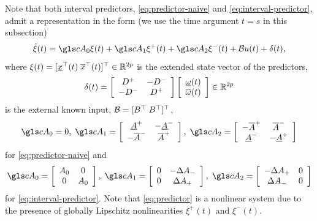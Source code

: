 Note that both interval predictors, \eqref{eq:predictor-naive} and
\eqref{eq:interval-predictor}, admit a representation in the form (we use the
time argument $t=s$ in this subsection)
\begin{equation}
\dot{\xi}(t)=\cA_{0}\xi(t)+\cA_{1}\xi^{+}(t)+\cA_{2}\xi^{-}(t)+\cB u(t)+\delta(t),\label{eq:predictor}
\end{equation}
where $\xi(t)=[\underline{x}^{\top}(t)\;\overline{x}^{\top}(t)]^{\top}\in\mathbb{R}^{2p}$
is the extended state vector of the predictors,
\[
\delta(t)=\left[\begin{array}{cc}
D^{+} & -D^{-}\\
-D^{-} & D^{+}
\end{array}\right]\left[\begin{array}{c}
\underline{\omega}(t)\\
\overline{\omega}(t)
\end{array}\right]\in\mathbb{R}^{2p}
\]
is the external known input, $\mathcal{B}=[B^{\top}\;B^{\top}]^{\top}$, 
\[
\cA_{0}=0,\;\cA_{1}=\left[\begin{array}{cc}
\underline{A}^{+} & -\underline{A}^{-}\\
-\overline{A}^{-} & \overline{A}^{+}
\end{array}\right],\;\cA_{2}=\left[\begin{array}{cc}
-\overline{A}^{+} & \overline{A}^{-}\\
\underline{A}^{-} & -\underline{A}^{+}
\end{array}\right]
\]
for \eqref{eq:predictor-naive} and
\[
\cA_{0}=\left[\begin{array}{cc}
A_{0} & 0\\
0 & A_{0}
\end{array}\right],\;\cA_{1}=\left[\begin{array}{cc}
0 & -\Delta A_{-}\\
0 & \Delta A_{+}
\end{array}\right],\;\cA_{2}=\left[\begin{array}{cc}
-\Delta A_{+} & 0\\
\Delta A_{-} & 0
\end{array}\right]
\]
for \eqref{eq:interval-predictor}. Note that \eqref{eq:predictor}
is a nonlinear system due to the presence of globally Lipschitz nonlinearities
$\xi^{+}(t)$ and $\xi^{-}(t)$. 

